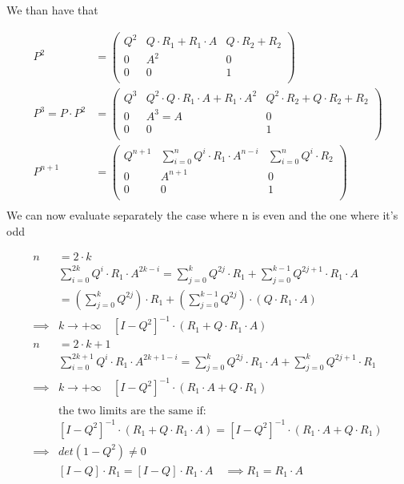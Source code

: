 We than have that

\begin{equation}\begin{split}
  P^2&=\begin{pmatrix}
      Q^2 & Q \cdot R_1 + R_1 \cdot A & Q \cdot R_2  + R_2\\
      0 & A^2   & 0 \\
      0 & 0   & 1 \\
  \end{pmatrix}
  \\
  P^{3} = P \cdot P^2 &=\begin{pmatrix}
      Q^3 & Q^2 \cdot Q \cdot R_1\cdot A + R_1 \cdot A^2 & Q^2 \cdot R_2  + Q \cdot R_2 +R_2\\
      0 & A^3=A   & 0 \\
      0 & 0   & 1 \\
  \end{pmatrix}\\
  P^{n+1}&=\begin{pmatrix}
      Q^{n+1} & \sum\limits_{i=0}^n Q^i \cdot R_1 \cdot A^{n-i} & \sum\limits_{i=0}^n Q^i \cdot R_2\\
      0 & A^{n+1}   & 0 \\
      0 & 0   & 1 \\
  \end{pmatrix}\\
\end{split}\end{equation}
We can now evaluate separately the case where n is even and the one where it's odd

\begin{equation}\begin{split}
  n &= 2 \cdot k \\
  &\sum\limits_{i=0}^{2k}Q^i \cdot R_1 \cdot A^{2k-i} = \sum\limits_{j=0}^{k}Q^{2j} \cdot R_1 + \sum\limits_{j=0}^{k-1}Q^{2j+1} \cdot R_1 \cdot A \\
  &=\left(\sum\limits_{j=0}^{k}Q^{2j} \right) \cdot R_1 + \left(\sum\limits_{j=0}^{k-1}Q^{2j} \right) \cdot (Q \cdot R_1 \cdot A)\\
  \implies & k  \to +\infty \quad [I - Q^2]^{-1} \cdot (R_1 + Q \cdot R_1 \cdot A)\\
  n &= 2 \cdot k + 1 \\
  &\sum\limits_{i=0}^{2k+1}Q^i \cdot R_1 \cdot A^{2k+1-i} = \sum\limits_{j=0}^{k}Q^{2j} \cdot R_1\cdot A + \sum\limits_{j=0}^{k}Q^{2j+1} \cdot R_1 \\
  \implies & k  \to +\infty \quad [I - Q^2]^{-1} \cdot (R_1 \cdot A + Q \cdot R_1 ) \\
  \\
  &\text{the two limits are the same if: }\\
  & [I - Q^2]^{-1} \cdot (R_1 + Q \cdot R_1 \cdot A) = [I - Q^2]^{-1} \cdot (R_1 \cdot A + Q \cdot R_1 )\\
  \implies & det(1-Q^2)\neq 0\\
  & [I-Q ]\cdot R_1 = [I-Q]\cdot R_1 \cdot A \quad \implies R_1 = R_1 \cdot A
\end{split}\end{equation}


